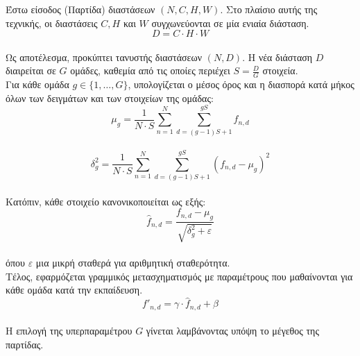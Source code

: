 \documentclass[12pt]{article}
\numberwithin{equation}{section}
\begin{document}
\noindent Έστω είσοδος (Παρτίδα) διαστάσεων \( (N, C, H, W) \). Στο πλαίσιο αυτής της τεχνικής, οι διαστάσεις \( C, H \) και \(W\) συγχωνεύονται σε μία ενιαία διάσταση.\\

\begin{equation}
D = C \cdot H \cdot W
\end{equation}\\

\noindent Ως αποτέλεσμα, προκύπτει τανυστής  διαστάσεων \( (N, D) \). Η νέα διάσταση \( D \) διαιρείται σε \( G \) ομάδες, καθεμία από τις οποίες περιέχει \( S = \frac{D}{G} \) στοιχεία.\\

\noindent Για κάθε ομάδα \( g \in \{1, \dots, G\} \), υπολογίζεται ο μέσος όρος και η διασπορά κατά μήκος όλων των δειγμάτων και των στοιχείων της ομάδας:\\

\begin{equation}
\mu_g = \frac{1}{N \cdot S} \sum_{n=1}^{N} \sum_{d=(g-1)S+1}^{gS} f_{n,d}
\end{equation}\\

\begin{equation}
\delta_g^2 = \frac{1}{N \cdot S} \sum_{n=1}^{N} \sum_{d=(g-1)S+1}^{gS} (f_{n,d} - \mu_g)^2
\end{equation}\\

\noindent Κατόπιν, κάθε στοιχείο κανονικοποιείται ως εξής:\\

\begin{equation}
\hat{f}_{n,d} = \frac{f_{n,d} - \mu_g}{\sqrt{\delta_g^2 + \varepsilon}}
\end{equation}\\

\noindent όπου \( \varepsilon \) μια μικρή σταθερά για αριθμητική σταθερότητα.\\

\noindent Τέλος, εφαρμόζεται γραμμικός μετασχηματισμός με παραμέτρους που μαθαίνονται για κάθε ομάδα κατά την εκπαίδευση.\\

\begin{equation}
f'_{n,d} = \gamma \cdot \hat{f}_{n,d} + \beta
\end{equation}\\

\noindent Η επιλογή της υπερπαραμέτρου \( G \) γίνεται λαμβάνοντας υπόψη το μέγεθος της παρτίδας.\\
\end{document}
